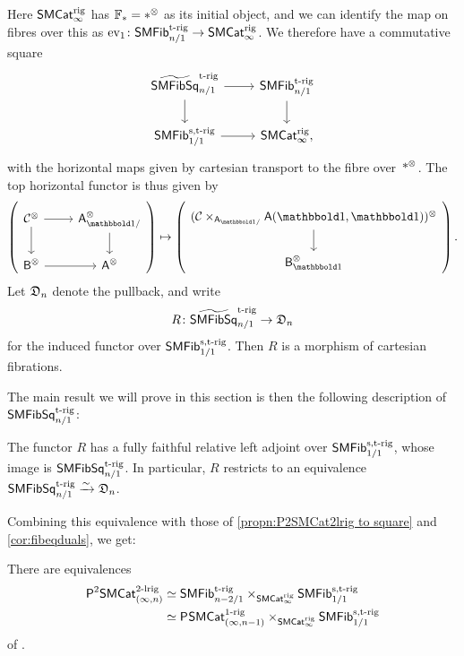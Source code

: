 \documentclass[a4paper,11pt]{article}
\begin{document}
\begin{observation}
  Here $\SMCatI^{\rig}$ has $\xF_{*} = *^{\otimes}$ as its initial object, and we
  can identify the map on fibres over this as
  $\ev_{1} \colon \SMFib_{n/1}^{\trig} \to \SMCatI^{\rig}$. We therefore
  have a commutative square
  \[
    \begin{tikzcd}
      \tSMFibSqtrig_{n/1} \ar[r] \ar[d] & \SMFib_{n/1}^{\trig}  \ar[d] \\
     \SMFib_{1/1}^{\strig} \ar[r] & \SMCatI^{\rig},
    \end{tikzcd}
  \]
  with the horizontal maps given by cartesian transport to the fibre
  over $*^{\otimes}$. The top horizontal functor is thus given by
  \[    \left( \begin{tikzcd}
      \nC^{\otimes} \ar[r] \ar[d] & \oA_{\bbone/}^{\otimes} \ar[d]
      \\
      \oB^{\otimes} \ar[r] & \oA^{\otimes}
    \end{tikzcd}
    \right) \mapsto
    \left(\begin{tikzcd}
      (\nC \times_{\oA_{\bbone/}} \oA(\bbone,\bbone))^{\otimes} \ar[d]
      \\\oB_{\bbone}^{\otimes}
    \end{tikzcd}
    \right).
 \]
  Let $\frD_{n}$ denote the pullback, and write
  \[ R \colon \tSMFibSqtrig_{n/1} \to \frD_{n}\]
  for the induced functor over $\SMFib_{1/1}^{\strig}$. Then  $R$
  is a morphism of cartesian fibrations.
\end{observation}

The main result we will prove in this section is then the following description of $\SMFibSqtrig_{n/1}$:
\begin{thm}\label{thm:2-step}
  The functor $R$ has a fully faithful relative left adjoint over
  $\SMFib_{1/1}^{\strig}$, whose image is $\SMFibSqtrig_{n/1}$. In particular, $R$
  restricts to an equivalence $\SMFibSqtrig_{n/1} \isoto \frD_{n}$.
\end{thm}
Combining this equivalence with those of \cref{propn:P2SMCat2lrig to
  square} and \cref{cor:fibeqduals}, we get:
\begin{cornoproof}\label{cor:P2 to CC}
  There are equivalences
  \[
    \begin{split}
      \PSMCatIn[2]^{2\dlrig} & \simeq \SMFib_{n-2/1}^{\trig}
      \times_{\SMCatI^{\rig}} \SMFib_{1/1}^{\strig} \\ &  \simeq
      \PSMCat_{(\infty,n-1)}^{\orig} \times_{\SMCatI^{\rig}} \SMFib_{1/1}^{\strig}
    \end{split}
  \]
  of \icats{}.
\end{cornoproof}
\end{document}
